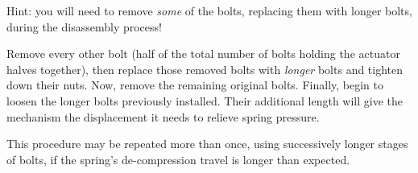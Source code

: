 





Hint: you will need to remove {\it some} of the bolts, replacing them with longer bolts, during the disassembly process!







Remove every other bolt (half of the total number of bolts holding the actuator halves together), then replace those removed bolts with {\it longer} bolts and tighten down their nuts.  Now, remove the remaining original bolts.  Finally, begin to loosen the longer bolts previously installed.  Their additional length will give the mechanism the displacement it needs to relieve spring pressure.

\vskip 10pt

This procedure may be repeated more than once, using successively longer stages of bolts, if the spring's de-compression travel is longer than expected.





